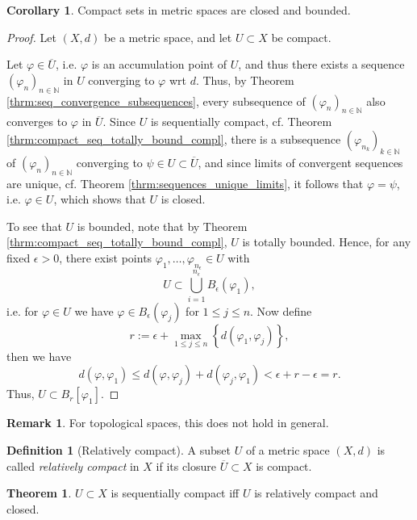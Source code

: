 \documentclass[12pt, a4paper]{article}
\numberwithin{equation}{section}
\theoremstyle{definition}
\theoremstyle{definition}
\newtheorem{defn}[thm]{Definition} %
\newtheorem{remark}[thm]{Remark} %
\newtheorem{theorem}[thm]{Theorem}
\newtheorem{corollary}[thm]{Corollary}
\newcommand{\seq}[1][\varphi]{\left( #1 \right)_{n \in \mathbb{N}}}
\begin{document}
	\begin{corollary}
		Compact sets in metric spaces are closed and bounded.
	\end{corollary}
	
	\begin{proof}
		Let $(X, d)$ be a metric space, and let $U\subset X$ be compact. 
		
		Let $\varphi\in \overline{U}$, i.e. $\varphi$ is an accumulation point of $U$, and thus there exists a sequence $\seq[\varphi_n]$ in $U$ converging to $\varphi$ wrt $d$. Thus, by Theorem \ref{thrm:seq_convergence_subsequences}, every subsequence of $\seq[\varphi_n]$ also converges to $\varphi$ in $\overline{U}$. Since $U$ is sequentially compact, cf. Theorem \ref{thrm:compact_seq_totally_bound_compl}, there is a subsequence $\left(\varphi_{n_k}\right)_{k\in\mathbb N}$ of $\seq[\varphi_n]$ converging to $\psi\in U\subset \overline{U}$, and since limits of convergent sequences are unique, cf. Theorem \ref{thrm:sequences_unique_limits}, it follows that $\varphi=\psi$, i.e. $\varphi\in U$, which shows that $U$ is closed.
		
		To see that $U$ is bounded, note that by Theorem \ref{thrm:compact_seq_totally_bound_compl}, $U$ is totally bounded. Hence, for any fixed $\epsilon > 0$, there exist points $\varphi_1, \dots, \varphi_{n_{\epsilon}}\in U$ with $$U\subset \bigcup_{i = 1}^{n_{\epsilon}}B_{\epsilon}(\varphi_1),$$ i.e. for $\varphi\in U$ we have $\varphi\in B_{\epsilon}(\varphi_j)$ for $1\leq j\leq n$. Now define
		$$r := \epsilon + \max_{1\leq j\leq n}\left\{ d(\varphi_1, \varphi_j)\right\},$$
		then we have
		$$d(\varphi, \varphi_1) \leq d(\varphi, \varphi_j) + d(\varphi_j, \varphi_1) < \epsilon + r - \epsilon = r.$$
		Thus, $U\subset B_{r}[\varphi_1]$.
	\end{proof}

	\begin{remark}
		For topological spaces, this does not hold in general.
	\end{remark}
	
	\begin{defn}[Relatively compact]
		A subset $U$ of a metric space $(X, d)$ is called \textit{relatively compact} in $X$ if its closure $\overline{U}\subset X$ is compact.
	\end{defn}

	\begin{theorem}
		$U\subset X$ is sequentially compact iff $U$ is relatively compact and closed.
	\end{theorem}
\end{document}
